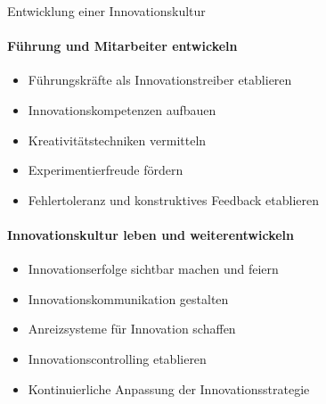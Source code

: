 \begin{KR}{Entwicklung einer Innovationskultur}
\paragraph{Führung und Mitarbeiter entwickeln}
\begin{itemize}
    \item Führungskräfte als Innovationstreiber etablieren
    \item Innovationskompetenzen aufbauen
    \item Kreativitätstechniken vermitteln
    \item Experimentierfreude fördern
    \item Fehlertoleranz und konstruktives Feedback etablieren
\end{itemize}

\paragraph{Innovationskultur leben und weiterentwickeln}
\begin{itemize}
    \item Innovationserfolge sichtbar machen und feiern
    \item Innovationskommunikation gestalten
    \item Anreizsysteme für Innovation schaffen
    \item Innovationscontrolling etablieren
    \item Kontinuierliche Anpassung der Innovationsstrategie
\end{itemize}
\end{KR}
